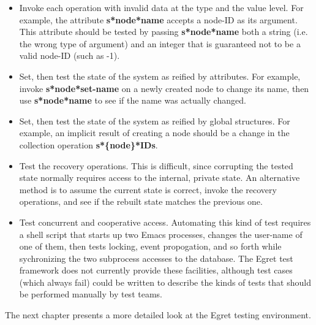 \begin{itemize}
  
\item Invoke each operation with invalid data at the type and the
  value level.  For example, the attribute {\bf s*node*name} accepts a
  node-ID as its argument.  This attribute should be tested by passing
  {\bf s*node*name} both a string (i.e. the wrong type of argument) and
  an integer that is guaranteed not to be a valid node-ID (such as -1).
  
\item Set, then test the state of the system as reified by attributes.
  For example, invoke {\bf s*node*set-name} on a newly created node to
  change its name, then use {\bf s*node*name} to see if the name was
  actually changed.
  
\item Set, then test the state of the system as reified by global
  structures.  For example, an implicit result of creating a node
  should be a change in the collection operation {\bf s*\{node\}*IDs}.
  
\item Test the recovery operations.  This is difficult, since
  corrupting the tested state normally requires access to the
  internal, private state.  An alternative method is to assume the
  current state is correct, invoke the recovery operations, and see if
  the rebuilt state matches the previous one.
  
\item Test concurrent and cooperative access. Automating this kind
  of test requires a shell script that starts up two Emacs processes,
  changes the user-name of one of them, then tests locking, event
  propogation, and so forth while sychronizing the two subprocess
  accesses to the database.  The Egret test framework does not 
  currently provide these facilities, although test cases (which 
  always fail) could be written to describe the kinds of tests that
  should be performed manually by test teams.
  
\end{itemize}

The next chapter presents a more detailed look at the Egret testing 
environment.
